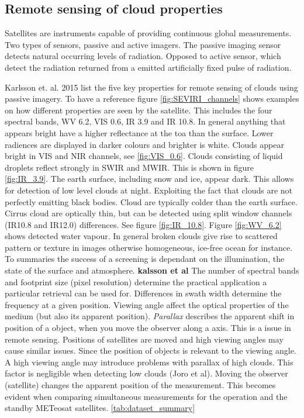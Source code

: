 \subsection{Remote sensing of cloud properties}
Satellites are instruments capable of providing continuous global measurements. Two types of sensors, passive and active imagers. The passive imaging sensor detects natural occurring levels of radiation. Opposed to active sensor, which detect the radiation returned from a emitted artificially fixed pulse of radiation.

Karlsson et. al. 2015 list the five key properties for remote sensing of clouds using passive imagery. To have a reference figure \ref{fig:SEVIRI_channels} shows examples on how different properties are seen by the satellite. This includes the four spectral bands, WV 6.2, VIS 0.6, IR 3.9 and IR 10.8. In general anything that appears bright have a higher reflectance at the \acrfull{toa} than the surface. Lower radiences are displayed in darker colours and brighter is white. Clouds appear bright in VIS and NIR channels, see \ref{fig:VIS_0.6}. Clouds consisting of liquid droplets reflect strongly in SWIR and MWIR. This is shown in figure \ref{fig:IR_3.9}. The earth surface, including snow and ice, appear dark. This allows for detection of low level clouds at night. Exploiting the fact that clouds are not perfectly emitting black bodies. Cloud are typically colder than the earth surface. Cirrus cloud are optically thin, but can be detected using split window channels (IR10.8 and IR12.0) differences. See figure \ref{fig:IR_10.8}. Figure \ref{fig:WV_6.2} shows detected water vapour. In general broken clouds give rise to scattered pattern or texture in images otherwise homogeneous, ice-free ocean for instance. To summaries the success of a screening is dependant on the illumination, the state of the surface and atmosphere. \textbf{kalsson et al} The number of spectral bands and footprint size (pixel resolution) determine the practical application a particular retrieval can be used for. Differences in swath width determine the frequency at a given position. Viewing angle affect the optical properties of the medium (but also its apparent position). \textit{Parallax} describes the apparent shift in position of a object, when you move the observer along a axis. This is a issue in remote sensing. Positions of satellites are moved and high viewing angles may cause similar issues. Since the position of objects is relevant to the viewing angle. A high viewing angle may introduce problems with parallax of high clouds. This factor is negligible when detecting low clouds (Joro et al). Moving the observer (satellite) changes the apparent position of the measurement. This becomes evident when comparing simultaneous measurements for the operation and the standby METeosat satellites. \ref{tab:dataset_summary}
